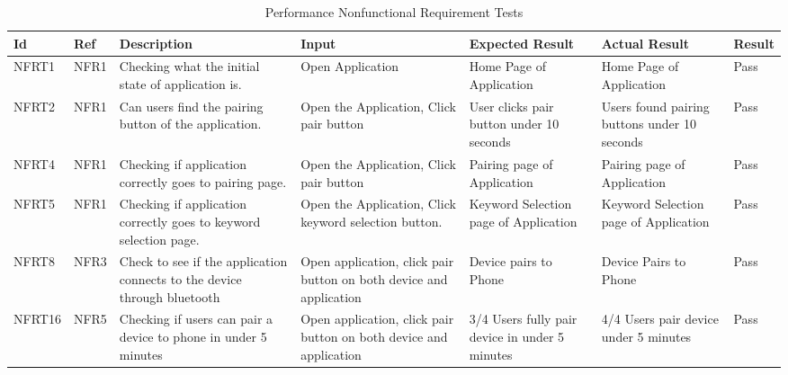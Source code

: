 \documentclass[12pt, titlepage]{article}
\begin{document}
\begin{longtable}{|p{1.4cm}|p{1cm}|p{3cm}|p{1.5cm}|p{2.5cm}|p{2cm}|p{1.2cm}|}
  \caption{Performance Nonfunctional Requirement Tests}
  \label{performanceNonfunctionalRequirementTests}
  \endfirsthead
  \endhead
  \hline
  \textbf{Id} & \textbf{Ref} & \textbf{Description}                                                         & \textbf{Input}                                    & \textbf{Expected Result}    & \textbf{Actual Result}                          & \textbf{Result}                                     \\ \hline
  NFRT1        & NFR1          & Checking what the initial state of application is.              & Open Application                          & Home Page of Application                      & Home Page of Application                        & {\color[HTML]{32CB00} Pass}                         \\ \hline
  NFRT2        & NFR1          & Can users find the pairing button of the application.           & Open the Application, Click pair button   & User clicks pair button under 10 seconds      & Users found pairing buttons under 10 seconds    & {\color[HTML]{32CB00} Pass}                         \\ \hline
  NFRT4        & NFR1          & Checking if application correctly goes to pairing page.         & Open the Application, Click pair button   & Pairing page of Application                   & Pairing page of Application                     & {\color[HTML]{32CB00} Pass}                         \\ \hline
  NFRT5        & NFR1          & Checking if application correctly goes to keyword selection page.& Open the Application, Click keyword selection button.& Keyword Selection page of Application& Keyword Selection page of Application        & {\color[HTML]{32CB00} Pass}                         \\ \hline
  NFRT8        & NFR3          & Check to see if the application connects to the device through bluetooth& Open application, click pair button on both device and application&Device pairs to Phone&Device Pairs to Phone                       & {\color[HTML]{32CB00} Pass}                        \\ \hline
  NFRT16       & NFR5          & Checking if users can pair a device to phone in under 5 minutes  & Open application, click pair button on both device and application& 3/4 Users fully pair device in under 5 minutes& 4/4 Users pair device under 5 minutes&{\color[HTML]{32CB00} Pass}            \\ \hline

\end{longtable}
\end{document}
